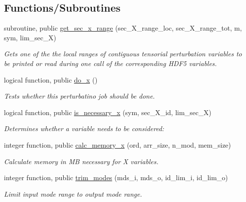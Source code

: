 \subsection*{Functions/\+Subroutines}
\begin{DoxyCompactItemize}
\item 
subroutine, public \hyperlink{namespacex__utilities_a6072ddd1fd230758795ff320c75a1f6a}{get\+\_\+sec\+\_\+x\+\_\+range} (sec\+\_\+\+X\+\_\+range\+\_\+loc, sec\+\_\+\+X\+\_\+range\+\_\+tot, m, sym, lim\+\_\+sec\+\_\+X)
\begin{DoxyCompactList}\small\item\em Gets one of the the local ranges of contiguous tensorial perturbation variables to be printed or read during one call of the corresponding H\+D\+F5 variables. \end{DoxyCompactList}\item 
logical function, public \hyperlink{namespacex__utilities_adef8eab82f0fd670a7795c754cf9a8f9}{do\+\_\+x} ()
\begin{DoxyCompactList}\small\item\em Tests whether this perturbatino job should be done. \end{DoxyCompactList}\item 
logical function, public \hyperlink{namespacex__utilities_a689aca7fedb49c43c5a65a18d557259f}{is\+\_\+necessary\+\_\+x} (sym, sec\+\_\+\+X\+\_\+id, lim\+\_\+sec\+\_\+X)
\begin{DoxyCompactList}\small\item\em Determines whether a variable needs to be considered\+: \end{DoxyCompactList}\item 
integer function, public \hyperlink{namespacex__utilities_a4d18921da77463d069346f1c7322b451}{calc\+\_\+memory\+\_\+x} (ord, arr\+\_\+size, n\+\_\+mod, mem\+\_\+size)
\begin{DoxyCompactList}\small\item\em Calculate memory in MB necessary for X variables. \end{DoxyCompactList}\item 
integer function, public \hyperlink{namespacex__utilities_afde797341c5056abecc7a9221dbd345e}{trim\+\_\+modes} (mds\+\_\+i, mds\+\_\+o, id\+\_\+lim\+\_\+i, id\+\_\+lim\+\_\+o)
\begin{DoxyCompactList}\small\item\em Limit input mode range to output mode range. \end{DoxyCompactList}\end{DoxyCompactItemize}


